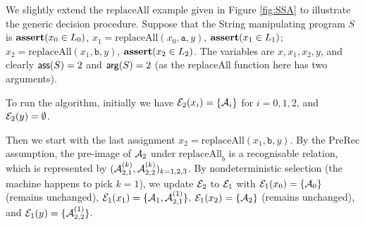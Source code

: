 \begin{example}	
%	
%	
%	
	We slightly extend the $\text{replaceAll}$ example given in Figure \ref{fig:SSA} to illustrate the generic decision procedure. Suppose that the String manipulating program $S$ is 
		$\textbf{assert}(x_0\in L_0)$, $x_1 = \text{replaceAll}(x_0,\texttt{a},y)$, $\textbf{assert}(x_1\in L_1)$; $x_2= \text{replaceAll}(x_1, \texttt{b}, y)$, $\textbf{assert}(x_2\in L_2)$. The variables are $x, x_1, x_2, y$, and clearly $\mathsf{ass}(S)=2$ and $\mathsf{arg}(S)=2$ (as the replaceAll function here has two arguments). 
		
		To run the algorithm, initially we have $ \mathcal{E}_2(x_i)= \{\mathcal{A}_i\}$ for $i=0,1,2$, and $ \mathcal{E}_2(y)= \emptyset$. 
		
		Then we start with the last assignment $x_2=\text{replaceAll}(x_1,\texttt{b},y)$. By the PreRec assumption, the pre-image of $\mathcal{A}_2$ under $\text{replaceAll}_b$ is a recognisable relation, which is 
		represented by  $(\mathcal{A}^{(k)}_{2, 1}, \mathcal{A}^{(k)}_{2, 2})_{ k=1,2,3}$. By nondeterministic selection (the machine happens to pick $k=1$), we update $\mathcal{E}_2$ to $\mathcal{E}_1$ with $\mathcal{E}_1(x_0)=\{\mathcal{A}_0\}$ (remains unchanged), $\mathcal{E}_1(x_1)=\{\mathcal{A}_1,\mathcal{A}^{(1)}_{2,1}\}$, $\mathcal{E}_1(x_2)=\{\mathcal{A}_2\}$ (remains unchanged), and $\mathcal{E}_1(y)=\{\mathcal{A}^{(1)}_{2,2}\}$. 
		
		

\end{example}
